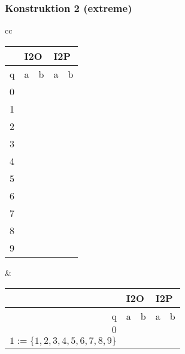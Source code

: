 \begin{frame}
  \frametitle{Konstruktion 2 (extreme)}
  \centering
  \begin{tabular}{cc}
    \begin{tabular}{|l|l|l|l|l|}
      \hline
      & \multicolumn{2}{l|}{I2O} & \multicolumn{2}{l|}{I2P} \\\hline
    q & a           & b          & a           & b          \\\hline\hline
    0  &             &            &             &            \\\hline
    \cellcolor[HTML]{DAE8FC}1 &             &            &             &            \\\hline
    \cellcolor[HTML]{DAE8FC}2 &             &            &             &            \\\hline
    \cellcolor[HTML]{DAE8FC}3 &             &            &             &            \\\hline
    \cellcolor[HTML]{DAE8FC}4 &             &            &             &            \\\hline
    \cellcolor[HTML]{DAE8FC}5 &             &            &             &            \\\hline
    \cellcolor[HTML]{DAE8FC}6 &             &            &             &            \\\hline
    \cellcolor[HTML]{DAE8FC}7 &             &            &             &            \\\hline
    \cellcolor[HTML]{DAE8FC}8 &             &            &             &            \\\hline
    \cellcolor[HTML]{DAE8FC}9 &             &            &             &           \\\hline
    \end{tabular}
    &
    \begin{tabular}{|r|r|r|r|r|}
      \hline
      & \multicolumn{2}{l|}{I2O} & \multicolumn{2}{l|}{I2P} \\\hline
    q & a           & b          & a           & b          \\\hline\hline
    \cellcolor[HTML]{DAE8FC}$0$  &             &            &             &            \\\hline
    $1:=\{1,2,3,4,5,6,7,8,9\}$ &             &            &             &            \\\hline
    \end{tabular}
    \end{tabular}
\end{frame}

\backupend